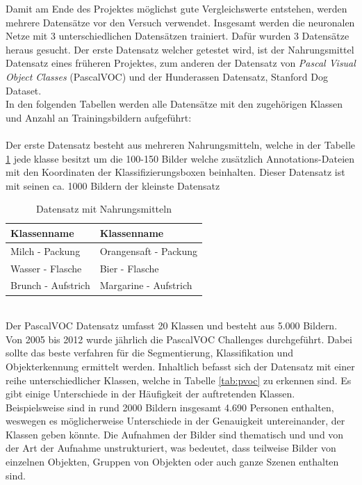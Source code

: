 \documentclass[a4paper,12pt,oneside]{article}
\begin{document}
Damit am Ende des Projektes möglichst gute Vergleichswerte entstehen, werden mehrere Datensätze vor den Versuch verwendet. Insgesamt werden die neuronalen Netze mit 3 unterschiedlichen Datensätzen trainiert. Dafür wurden 3 Datensätze heraus gesucht. Der erste Datensatz welcher getestet wird, ist der Nahrungsmittel Datensatz eines früheren Projektes, zum anderen der Datensatz von \textit{Pascal Visual Object Classes} (PascalVOC) und der Hunderassen Datensatz, Stanford Dog Dataset.\\
In den folgenden Tabellen werden alle Datensätze mit den zugehörigen Klassen und Anzahl an Trainingsbildern aufgeführt:\\\\
Der erste Datensatz besteht aus mehreren Nahrungsmitteln, welche in der Tabelle \ref{tab:nahrungsmittel} jede klasse besitzt um die 100-150 Bilder welche zusätzlich Annotations-Dateien mit den Koordinaten der Klassifizierungsboxen beinhalten. Dieser Datensatz ist mit seinen ca. 1000 Bildern der kleinste Datensatz 
\begin{table}
[h]
\caption{Datensatz mit Nahrungsmitteln}
\centering
\begin{tabular}{|l|l|}
\hline
Klassenname & Klassenname\\
\hline
Milch - Packung & Orangensaft - Packung\\
Wasser - Flasche & Bier - Flasche\\
Brunch - Aufstrich & Margarine - Aufstrich\\

\hline
\end{tabular}
\label{tab:nahrungsmittel}
\end{table}\\
Der PascalVOC Datensatz umfasst 20 Klassen und besteht aus 5.000 Bildern. Von 2005 bis 2012 wurde jährlich die PascalVOC Challenges durchgeführt. Dabei sollte das beste verfahren für die Segmentierung, Klassifikation und Objekterkennung ermittelt werden. Inhaltlich befasst sich der Datensatz mit einer reihe unterschiedlicher Klassen, welche in Tabelle \ref{tab:pvoc} zu erkennen sind. Es gibt einige Unterschiede in der Häufigkeit der auftretenden Klassen. Beispielsweise sind in rund 2000 Bildern insgesamt 4.690 Personen enthalten, weswegen es möglicherweise Unterschiede in der Genauigkeit untereinander, der Klassen geben könnte. Die Aufnahmen der Bilder sind thematisch und und von der Art der Aufnahme unstrukturiert, was bedeutet, dass teilweise Bilder von einzelnen Objekten, Gruppen von Objekten oder auch ganze Szenen enthalten sind.\\
\end{document}
